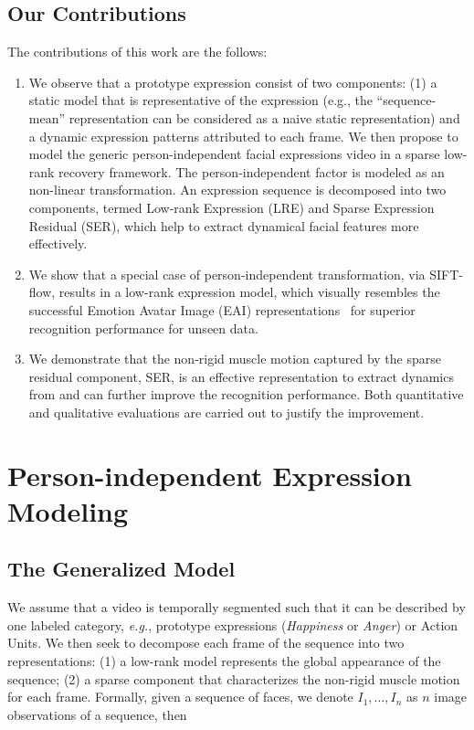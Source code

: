 \documentclass[journal]{IEEEtran}
\begin{document}
\subsection{Our Contributions}
The contributions of this work are the follows:
\begin{enumerate}
\item We observe that a prototype expression consist of two components: (1) a static model that is representative of the expression (e.g., the ``sequence-mean'' representation can be considered as a naive static representation) and a dynamic expression patterns attributed to each frame. We then propose to model the generic person-independent facial expressions video in a sparse low-rank recovery framework. The person-independent factor is modeled as an non-linear transformation. An expression sequence is decomposed into two components, termed Low-rank Expression (LRE) and Sparse Expression Residual (SER), which help to extract dynamical facial features more effectively. 

\item We show that a special case of person-independent transformation, via SIFT-flow, results in a low-rank expression model, which visually resembles the successful Emotion Avatar Image (EAI) representations~\cite{Yang_SMCB12} for superior recognition performance for unseen data.

\item We demonstrate that the non-rigid muscle motion captured by the sparse residual component, SER, is an effective representation to extract dynamics from and can further improve the recognition performance. Both quantitative and qualitative evaluations are carried out to justify the improvement. 

\end{enumerate}

\section{Person-independent Expression Modeling\label{sec:decompose}}

\subsection{The Generalized Model} 
We assume that a video is temporally segmented such that it can be described by one labeled category, \textit{e.g.}, prototype expressions (\textit{Happiness} or \textit{Anger}) or Action Units. We then seek to decompose each frame of the sequence into two representations: (1) a low-rank model represents the global appearance of the sequence; (2) a sparse component that characterizes the non-rigid muscle motion for each frame. Formally, given a sequence of faces, we denote $I_1, \ldots, I_n$ as $n$ image observations of a sequence, then
\end{document}
